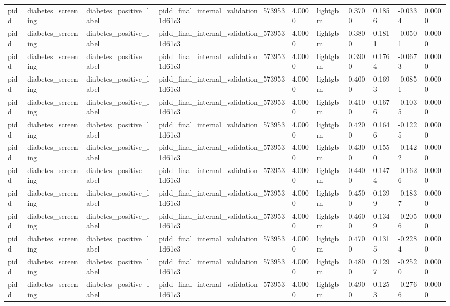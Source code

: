 \begin{tabular}{llllllllll}
pidd & diabetes\_screening & diabetes\_positive\_label & pidd\_final\_internal\_validation\_5739531d61c3 & 4.0000 & lightgbm & 0.3700 & 0.1856 & -0.0334 & 0.0000 \\
pidd & diabetes\_screening & diabetes\_positive\_label & pidd\_final\_internal\_validation\_5739531d61c3 & 4.0000 & lightgbm & 0.3800 & 0.1811 & -0.0501 & 0.0000 \\
pidd & diabetes\_screening & diabetes\_positive\_label & pidd\_final\_internal\_validation\_5739531d61c3 & 4.0000 & lightgbm & 0.3900 & 0.1764 & -0.0673 & 0.0000 \\
pidd & diabetes\_screening & diabetes\_positive\_label & pidd\_final\_internal\_validation\_5739531d61c3 & 4.0000 & lightgbm & 0.4000 & 0.1693 & -0.0851 & 0.0000 \\
pidd & diabetes\_screening & diabetes\_positive\_label & pidd\_final\_internal\_validation\_5739531d61c3 & 4.0000 & lightgbm & 0.4100 & 0.1676 & -0.1035 & 0.0000 \\
pidd & diabetes\_screening & diabetes\_positive\_label & pidd\_final\_internal\_validation\_5739531d61c3 & 4.0000 & lightgbm & 0.4200 & 0.1646 & -0.1225 & 0.0000 \\
pidd & diabetes\_screening & diabetes\_positive\_label & pidd\_final\_internal\_validation\_5739531d61c3 & 4.0000 & lightgbm & 0.4300 & 0.1550 & -0.1422 & 0.0000 \\
pidd & diabetes\_screening & diabetes\_positive\_label & pidd\_final\_internal\_validation\_5739531d61c3 & 4.0000 & lightgbm & 0.4400 & 0.1474 & -0.1626 & 0.0000 \\
pidd & diabetes\_screening & diabetes\_positive\_label & pidd\_final\_internal\_validation\_5739531d61c3 & 4.0000 & lightgbm & 0.4500 & 0.1399 & -0.1837 & 0.0000 \\
pidd & diabetes\_screening & diabetes\_positive\_label & pidd\_final\_internal\_validation\_5739531d61c3 & 4.0000 & lightgbm & 0.4600 & 0.1349 & -0.2056 & 0.0000 \\
pidd & diabetes\_screening & diabetes\_positive\_label & pidd\_final\_internal\_validation\_5739531d61c3 & 4.0000 & lightgbm & 0.4700 & 0.1315 & -0.2284 & 0.0000 \\
pidd & diabetes\_screening & diabetes\_positive\_label & pidd\_final\_internal\_validation\_5739531d61c3 & 4.0000 & lightgbm & 0.4800 & 0.1297 & -0.2520 & 0.0000 \\
pidd & diabetes\_screening & diabetes\_positive\_label & pidd\_final\_internal\_validation\_5739531d61c3 & 4.0000 & lightgbm & 0.4900 & 0.1253 & -0.2766 & 0.0000 \\

\end{tabular}
